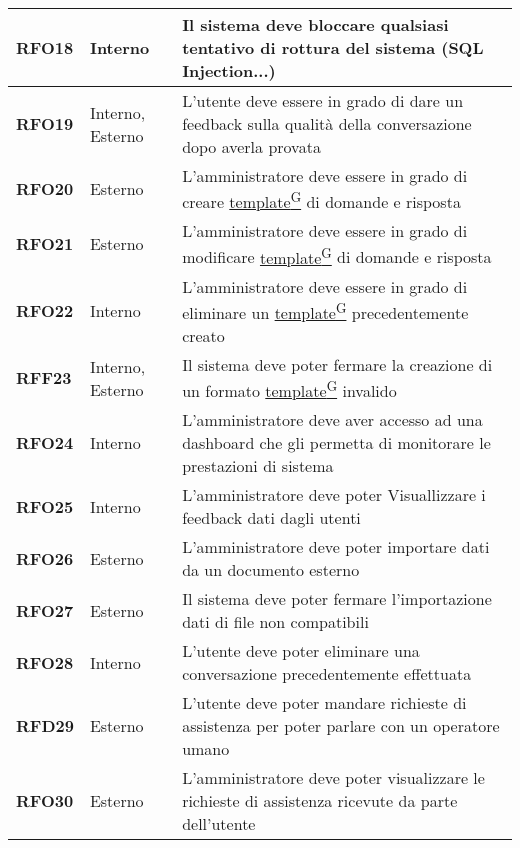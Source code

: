 \begin{longtable}{|>{\centering\arraybackslash}m{}|>{\centering\arraybackslash}m{}|>{\arraybackslash}m{}|}
	\hline
	\textbf{RFO18} & Interno & Il sistema deve bloccare qualsiasi tentativo di rottura del sistema (SQL Injection...)\\
	\hline
	\textbf{RFO19} & Interno, Esterno & L'utente deve essere in grado di dare un feedback sulla qualità della conversazione dopo averla provata\\
	\hline
	\textbf{RFO20} & Esterno & L'amministratore deve essere in grado di creare \href{https://code7crusaders.github.io/docs/RTB/documentazione_interna/glossario.html#template}{template\textsuperscript{G}} di domande e risposta\\
	\hline
	\textbf{RFO21} & Esterno & L'amministratore deve essere in grado di modificare \href{https://code7crusaders.github.io/docs/RTB/documentazione_interna/glossario.html#template}{template\textsuperscript{G}} di domande e risposta\\
	\hline
	\textbf{RFO22} & Interno & L'amministratore deve essere in grado di eliminare un \href{https://code7crusaders.github.io/docs/RTB/documentazione_interna/glossario.html#template}{template\textsuperscript{G}} precedentemente creato\\
	\hline
	\textbf{RFF23} & Interno, Esterno & Il sistema deve poter fermare la creazione di un formato \href{https://code7crusaders.github.io/docs/RTB/documentazione_interna/glossario.html#template}{template\textsuperscript{G}} invalido\\
	\hline
	\textbf{RFO24} & Interno & L'amministratore deve aver accesso ad una dashboard che gli permetta di monitorare le prestazioni di sistema\\
	\hline
	\textbf{RFO25} & Interno & L'amministratore deve poter Visuallizzare i feedback dati dagli utenti\\
	\hline
	\textbf{RFO26} & Esterno & L'amministratore deve poter importare dati da un documento esterno\\
	\hline
	\textbf{RFO27} & Esterno & Il sistema deve poter fermare l'importazione dati di file non compatibili\\
	\hline
	\textbf{RFO28} & Interno & L'utente deve poter eliminare una conversazione precedentemente effettuata\\
	\hline
	\textbf{RFD29} & Esterno & L'utente deve poter mandare richieste di assistenza per poter parlare con un operatore umano\\
	\hline
	\textbf{RFO30} & Esterno & L'amministratore deve poter visualizzare le richieste di assistenza ricevute da parte dell'utente\\
	\hline

\end{longtable}
